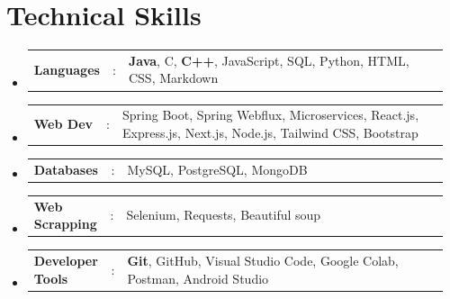 \documentclass[letterpaper,11pt]{article}
\newcommand{\resumeSectionType}[3]{
  \item\begin{tabular*}{0.9\textwidth}[t]{
    p{0.17\linewidth}p{0.02\linewidth}p{0.77\linewidth}
  }
    \textbf{#1} & #2 & #3
  \end{tabular*}\vspace{-2pt}
}
\begin{document}

\section{Technical Skills}
\begin{itemize}
    \resumeSectionType{Languages}{:}{\textbf{Java}, C, \textbf{C++}, JavaScript, SQL, Python, HTML, CSS, Markdown}
    \resumeSectionType{Web Dev}{:}{Spring Boot, Spring Webflux, Microservices, React.js, Express.js, Next.js, Node.js, Tailwind CSS, Bootstrap}
    \resumeSectionType{Databases}{:}{MySQL, PostgreSQL, MongoDB}
    \resumeSectionType{Web Scrapping}{:}{Selenium, Requests, Beautiful soup}
    \resumeSectionType{Developer Tools}{:}{\textbf{Git}, GitHub, Visual Studio Code, Google Colab, Postman, Android Studio}
\end{itemize}
\vspace{-13pt}

\end{document}
